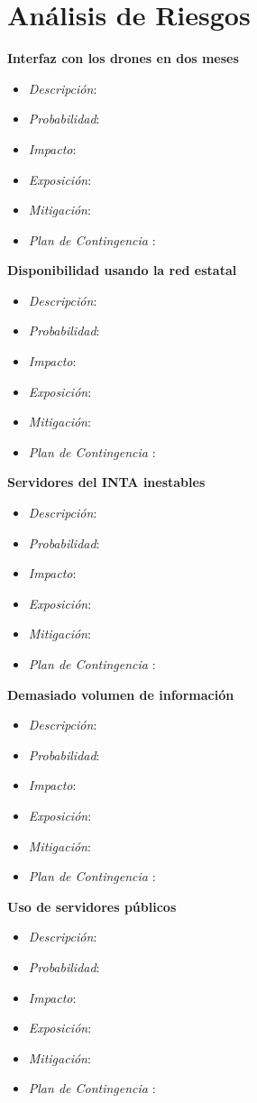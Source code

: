 \section{Análisis de Riesgos}

\textbf{Interfaz con los drones en dos meses}
\begin{itemize}
 \item \textsl{Descripci\'on}: 
 \item \textsl{Probabilidad}: 
 \item \textsl{Impacto}: 
 \item \textsl{Exposición}: 
 \item \textsl{Mitigación}: 
 \item \textsl{Plan de Contingencia} : 
\end{itemize}
\textbf{Disponibilidad usando la red estatal}
\begin{itemize}
 \item \textsl{Descripci\'on}: 
 \item \textsl{Probabilidad}: 
 \item \textsl{Impacto}: 
 \item \textsl{Exposición}: 
 \item \textsl{Mitigación}: 
 \item \textsl{Plan de Contingencia} : 
\end{itemize}
\textbf{Servidores del INTA inestables}
\begin{itemize}
 \item \textsl{Descripci\'on}: 
 \item \textsl{Probabilidad}: 
 \item \textsl{Impacto}: 
 \item \textsl{Exposición}: 
 \item \textsl{Mitigación}: 
 \item \textsl{Plan de Contingencia} : 
\end{itemize}
\textbf{Demasiado volumen de informaci\'on }
\begin{itemize}
 \item \textsl{Descripci\'on}: 
 \item \textsl{Probabilidad}: 
 \item \textsl{Impacto}: 
 \item \textsl{Exposición}: 
 \item \textsl{Mitigación}: 
 \item \textsl{Plan de Contingencia} : 
\end{itemize}
\textbf{Uso de servidores p\'ublicos}
\begin{itemize}
 \item \textsl{Descripci\'on}: 
 \item \textsl{Probabilidad}: 
 \item \textsl{Impacto}: 
 \item \textsl{Exposición}: 
 \item \textsl{Mitigación}: 
 \item \textsl{Plan de Contingencia} : 
\end{itemize}
